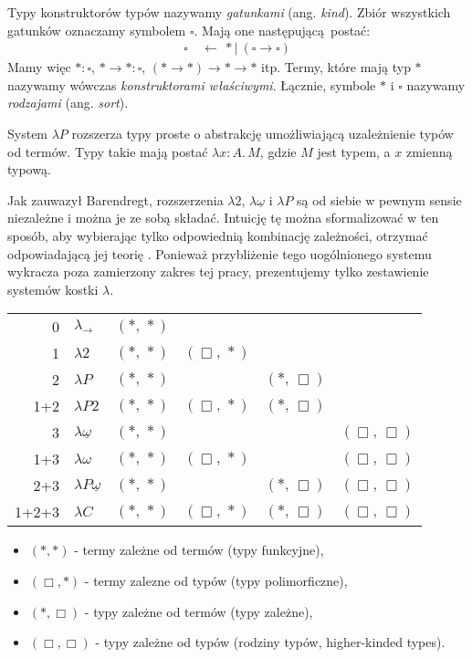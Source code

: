 Typy konstruktorów typów nazywamy \emph{gatunkami} (ang. \emph{kind}). Zbiór wszystkich gatunków oznaczamy symbolem \(\square\). Mają one następującą postać:
  \begin{align*}
    \square\ &\leftarrow\ \ast |\ (\square\to\square)
  \end{align*}
Mamy   więc    \(\ast:\square\),   \(\ast\to\ast    :   \square\),
\((\ast\to\ast)\to\ast\to\ast\)  itp.   Termy,  które   mają  typ
\(\ast\)  nazywamy   wówczas  \emph{konstruktorami  właściwymi}.
Łącznie, symbole \(\ast\)  i \(\square\) nazywamy \emph{rodzajami}
(ang. \emph{sort}).

System \(\lambda P\) rozszerza typy proste o abstrakcję umożliwiającą uzależnienie typów od termów. Typy takie mają postać \(\lambda x:A.\,M\), gdzie \(M\) jest typem, a \(x\) zmienną typową. 

Jak zauwazył Barendregt, rozszerzenia \(\lambda 2\), \(\lambda{\underline{\omega}}\) i \(\lambda P\) są od siebie w pewnym sensie niezależne i można je ze sobą składać. Intuicję tę można sformalizować  w ten sposób, aby wybierając tylko odpowiednią kombinację zależności, otrzymać odpowiadającą jej teorię \cite{barendregt_1991}. Ponieważ przybliżenie tego uogólnionego systemu wykracza poza zamierzony zakres tej pracy, prezentujemy tylko zestawienie systemów kostki \(\lambda\).

  \begin{center}
  \begin{tabular}{r | l | c c c c}
    0 & \(\lambda_{\to}\)                 & \((*,\,*)\) \\
    1 & \(\lambda 2\)                     & \((*,\,*)\) & \((\Box,\,*)\) \\
    2 & \(\lambda P\)                     & \((*,\,*)\) & & \((*,\,\Box)\) \\
    1+2 & \(\lambda P2\)                  & \((*,\,*)\) & \((\Box,\,*)\) & \((*,\,\Box)\) \\
    3 & \(\lambda \underline{\omega}\)    & \((*,\,*)\) & & & \((\Box,\,\Box)\)\\
    1+3 & \(\lambda \omega\)              & \((*,\,*)\) & \((\Box,\,*)\) & & \((\Box,\,\Box)\)\\
    2+3 & \(\lambda P\underline{\omega}\) & \((*,\,*)\) & & \((*,\,\Box)\) & \((\Box,\,\Box)\) \\
    1+2+3 & \(\lambda C\)                 & \((*,\,*)\) & \((\Box,\,*)\) & \((*,\,\Box)\) & \((\Box,\,\Box)\) \\
  \end{tabular}

  \begin{itemize}
    \item \((*,*)\) - termy zależne od termów (typy funkcyjne),
    \item \((\Box,*)\) - termy zalezne od typów (typy polimorficzne),
    \item \((*,\Box)\) - typy zależne od termów (typy zależne),
    \item \((\Box, \Box)\) - typy zależne od typów (rodziny typów, higher-kinded types).
  \end{itemize}
  \end{center}

